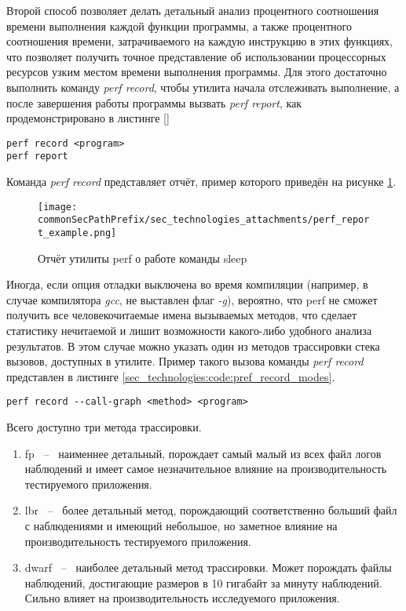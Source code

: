 Второй способ позволяет делать детальный анализ процентного соотношения времени выполнения каждой функции программы, 
а также процентного соотношения времени, затрачиваемого на каждую инструкцию в этих функциях, что позволяет 
получить точное представление об использовании процессорных ресурсов узким местом времени выполнения программы. Для этого
достаточно выполнить команду \textit{perf record}, чтобы утилита начала отслеживать выполнение, а после завершения работы программы
вызвать \textit{perf report}, как продемонстрировано в листинге \ref{}

\begin{lstlisting}[style=CodeListing, label=sec_tech:code:perf_record_report, caption={Пример использования команд perf record и perf report}]
perf record <program>
perf report
\end{lstlisting}

Команда \textit{perf record} представляет отчёт, пример которого приведён на рисунке \ref{sec_technologies:fig:perf_report_example}.
\begin{figure}[H]
    \centering
    \texttt{[image: \\commonSecPathPrefix/sec\_technologies\_attachments/perf\_report\_example.png]}
    \caption{Отчёт утилиты perf о работе команды sleep}
    \label{sec_technologies:fig:perf_report_example}
\end{figure}

Иногда, если опция отладки выключена во время компиляции (например, в случае компилятора \textit{gcc}, не выставлен флаг \textit{-g}),
вероятно, что perf не сможет получить все человекочитаемые имена вызываемых методов, что сделает статистику 
нечитаемой и лишит возможности какого-либо удобного анализа результатов. 
В этом случае можно указать один из методов трассировки стека вызовов, доступных в утилите.
Пример такого вызова команды \textit{perf record} представлен в листинге \ref{sec_technologies:code:pref_record_modes}.

\begin{lstlisting}[style=CodeListing, label=sec_technologies:code:pref_record_modes, caption={Вызов команды perf record с указанием метода трассировки стека вызовов}]
perf record --call-graph <method> <program>
\end{lstlisting}

Всего доступно три метода трассировки.
\begin{enumerate}
    \item fp ~--~ наименнее детальный, порождает самый малый из всех файл логов наблюдений и имеет самое незначительное влияние на производительность тестируемого приложения.
    \item lbr ~--~ более детальный метод, порождающий соответственно больший файл с наблюдениями и имеющий небольшое, но заметное влияние на производительность тестируемого приложения.
    \item dwarf ~--~ наиболее детальный метод трассировки. Может порождать файлы наблюдений, достигающие размеров в 10 гигабайт за минуту наблюдений. Сильно влияет на производительность исследуемого приложения.
\end{enumerate}


